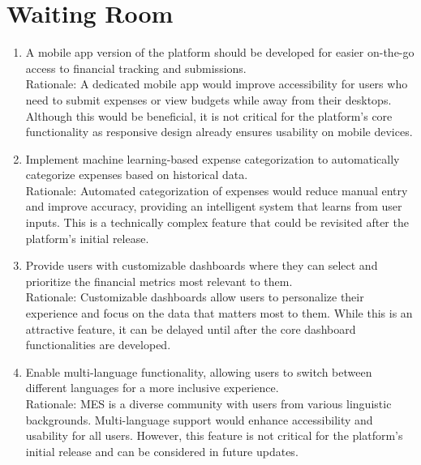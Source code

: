 \documentclass[12pt]{article}
\begin{document}
\section{Waiting Room}
\begin{enumerate}
  \item A mobile app version of the platform should be developed for easier on-the-go access to financial tracking and submissions. \\
  Rationale: A dedicated mobile app would improve accessibility for users who need to submit expenses or view budgets while away from their desktops. Although this would be beneficial, it is not critical for the platform's core functionality as responsive design already ensures usability on mobile devices.
  \item Implement machine learning-based expense categorization to automatically categorize expenses based on historical data. \\
  Rationale: Automated categorization of expenses would reduce manual entry and improve accuracy, providing an intelligent system that learns from user inputs. This is a technically complex feature that could be revisited after the platform's initial release.
  \item Provide users with customizable dashboards where they can select and prioritize the financial metrics most relevant to them. \\
  Rationale: Customizable dashboards allow users to personalize their experience and focus on the data that matters most to them. While this is an attractive feature, it can be delayed until after the core dashboard functionalities are developed.
  \item Enable multi-language functionality, allowing users to switch between different languages for a more inclusive experience. \\
  Rationale: MES is a diverse community with users from various linguistic backgrounds. Multi-language support would enhance accessibility and usability for all users. However, this feature is not critical for the platform's initial release and can be considered in future updates.
\end{enumerate}
\end{document}

